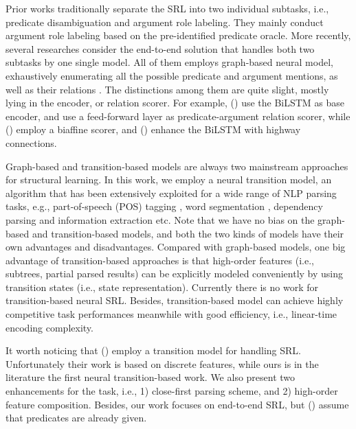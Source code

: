 \documentclass[letterpaper]{article} %
\begin{document}
\begin{CJK}{UTF8}{gbsn}
Prior works traditionally separate the SRL into two individual subtasks, i.e., predicate disambiguation and argument role labeling.
They mainly conduct argument role labeling based on the pre-identified predicate oracle.
More recently, several researches consider the end-to-end solution that handles both two subtasks by one single model.
All of them employs graph-based neural model, exhaustively enumerating all the possible predicate and argument mentions, as well as their relations \cite{he-etal-2018-jointly,cai-etal-2018-full,LiHZZZZZ19,fei-etal-2020-high}.
The distinctions among them are quite slight, mostly lying in the encoder, or relation scorer.
For example, \citeauthor{he-etal-2018-jointly} (\citeyear{he-etal-2018-jointly}) use the BiLSTM \cite{hochreiter1997long} as base encoder, and use a feed-forward layer as predicate-argument relation scorer, while \citeauthor{cai-etal-2018-full} (\citeyear{cai-etal-2018-full}) employ a biaffine scorer, and \citeauthor{LiHZZZZZ19} (\citeyear{he-etal-2018-jointly}) enhance the BiLSTM with highway connections.




Graph-based and transition-based models are always two mainstream approaches for structural learning. 
In this work, we employ a neural transition model, an algorithm that has been extensively exploited for a wide range of NLP parsing tasks, e.g., part-of-speech (POS) tagging \cite{zhang-clark-2010-fast,LyuZJ16}, word segmentation \cite{zhang-etal-2016-transition,ZhangZF18}, dependency parsing \cite{zhou-etal-2015-neural,dyer-etal-2015-transition,YuanJT19} and information extraction  \cite{wang-etal-2018-neural-transition,ZhangQZLJ19}etc.
Note that we have no bias on the graph-based and transition-based models, and both the two kinds of models have their own advantages and disadvantages.
Compared with graph-based models, one big advantage of transition-based approaches is that high-order features (i.e., subtrees, partial parsed results) can be explicitly modeled conveniently by using
transition states (i.e., state representation). 
Currently there is no work for transition-based neural SRL.
Besides, transition-based model can achieve highly competitive task performances meanwhile with good efficiency, i.e., linear-time encoding complexity.



It worth noticing that \citeauthor{choi-palmer-2011-transition} (\citeyear{choi-palmer-2011-transition}) employ a transition model for handling SRL.
Unfortunately their work is based on discrete features, while ours is in the literature the first neural transition-based work.
We also present two enhancements for the task, i.e., 1) close-first parsing scheme, and 2) high-order feature composition. 
Besides, our work focuses on end-to-end SRL, but \citeauthor{choi-palmer-2011-transition} (\citeyear{choi-palmer-2011-transition}) assume that predicates are already given.








\end{CJK}
\end{document}
